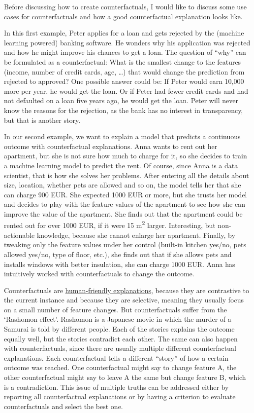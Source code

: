 \documentclass[
  11pt,
]{scrbook}
\begin{document}
Before discussing how to create counterfactuals, I would like to discuss some use cases for counterfactuals and how a good counterfactual explanation looks like.

In this first example, Peter applies for a loan and gets rejected by the (machine learning powered) banking software.
He wonders why his application was rejected and how he might improve his chances to get a loan.
The question of ``why'' can be formulated as a counterfactual:
What is the smallest change to the features (income, number of credit cards, age, \ldots) that would change the prediction from rejected to approved?
One possible answer could be:
If Peter would earn 10,000 more per year, he would get the loan.
Or if Peter had fewer credit cards and had not defaulted on a loan five years ago, he would get the loan.
Peter will never know the reasons for the rejection, as the bank has no interest in transparency, but that is another story.

In our second example, we want to explain a model that predicts a continuous outcome with counterfactual explanations.
Anna wants to rent out her apartment, but she is not sure how much to charge for it, so she decides to train a machine learning model to predict the rent.
Of course, since Anna is a data scientist, that is how she solves her problems.
After entering all the details about size, location, whether pets are allowed and so on, the model tells her that she can charge 900 EUR.
She expected 1000 EUR or more, but she trusts her model and decides to play with the feature values of the apartment to see how she can improve the value of the apartment.
She finds out that the apartment could be rented out for over 1000 EUR, if it were 15 m\textsuperscript{2} larger.
Interesting, but non-actionable knowledge, because she cannot enlarge her apartment.
Finally, by tweaking only the feature values under her control (built-in kitchen yes/no, pets allowed yes/no, type of floor, etc.), she finds out that if she allows pets and installs windows with better insulation, she can charge 1000 EUR.
Anna has intuitively worked with counterfactuals to change the outcome.

Counterfactuals are \protect\hyperlink{good-explanation}{human-friendly explanations}, because they are contrastive to the current instance and because they are selective, meaning they usually focus on a small number of feature changes.
But counterfactuals suffer from the `Rashomon effect'.
Rashomon is a Japanese movie in which the murder of a Samurai is told by different people.
Each of the stories explains the outcome equally well, but the stories contradict each other.
The same can also happen with counterfactuals, since there are usually multiple different counterfactual explanations.
Each counterfactual tells a different ``story'' of how a certain outcome was reached.
One counterfactual might say to change feature A, the other counterfactual might say to leave A the same but change feature B, which is a contradiction.
This issue of multiple truths can be addressed either by reporting all counterfactual explanations or by having a criterion to evaluate counterfactuals and select the best one.
\end{document}
